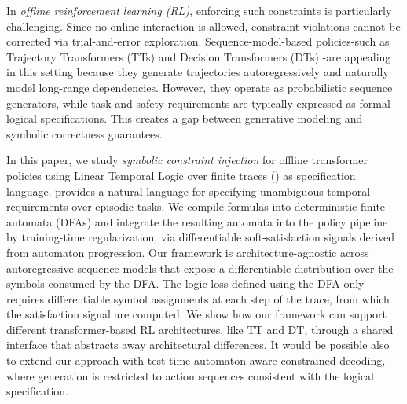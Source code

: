 In \emph{offline reinforcement learning (RL)}, enforcing such constraints is particularly challenging. Since no online interaction is allowed, constraint violations cannot be corrected via trial-and-error exploration. Sequence-model-based policies-such as Trajectory Transformers (TTs) \cite{trajectory_transformers} and Decision Transformers (DTs) \cite{decision_transformers}-are appealing in this setting because they generate trajectories autoregressively and naturally model long-range dependencies. However, they operate as probabilistic sequence generators, while task and safety requirements are typically expressed as formal logical specifications. This creates a gap between generative modeling and symbolic correctness guarantees.

In this paper, we study \emph{symbolic constraint injection} \cite{UmiliPMAI24,mezini2025neuro} for offline transformer policies using Linear Temporal Logic over finite traces (\ltlf) \cite{LTLf} as specification language. \ltlf provides a natural language for specifying unambiguous temporal requirements over episodic tasks. We compile \ltlf formulas into deterministic finite automata (DFAs) and integrate the resulting automata into the policy pipeline by training-time regularization, via differentiable soft-satisfaction signals derived from automaton progression. 
Our framework is architecture-agnostic across autoregressive sequence models that expose a differentiable distribution over the symbols consumed by the DFA. The logic loss defined using the DFA only requires differentiable symbol assignments at each step of the trace, from which the satisfaction signal are computed.
We show how our framework can support different transformer-based RL architectures, like TT and DT, through a shared interface that abstracts away architectural differences. It would be possible also to extend our approach with test-time automaton-aware constrained decoding, where generation is restricted to action sequences consistent with the logical specification.

